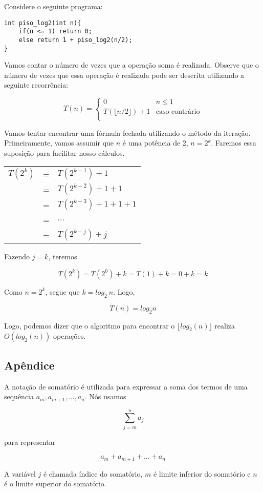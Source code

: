 Considere o seguinte programa:


\begin{verbatim}
int piso_log2(int n){
    if(n <= 1) return 0;
    else return 1 + piso_log2(n/2);
}
\end{verbatim}

Vamos contar o número de vezes que a operação soma é realizada. Observe que o número de vezes que essa operação é realizada pode ser descrita utilizando a seguinte recorrência:

$$
T(n) = 
\begin{cases}
0 & n \leq 1\\
T( \lfloor n/2 \rfloor ) + 1 & \text{caso contrário}\\
\end{cases}
$$

Vamos tentar encontrar uma fórmula fechada utilizando o método da iteração. Primeiramente, vamos assumir que $n$ é uma potência de 2, $n = 2^k$. Faremos essa suposição para facilitar nosso cálculos.

\begin{tabular}{lll}
$T(2^k)$ & = & $T(2^{k-1}) + 1$ \\
       & = & $T(2^{k-2}) + 1 + 1$\\
       & = & $T(2^{k-3}) + 1 + 1 + 1$\\
       & = & $\ldots$ \\
       & = &  $T(2^{k-j}) + j$\\
\end{tabular}

Fazendo $j = k$, teremos

$$T(2^k) = T(2^0) + k = T(1) + k = 0 + k = k$$

Como $n = 2^k$, segue que $k = log_2 ~n$. Logo,

$$T(n) = log_2 n$$

Logo, podemos dizer que o algoritmo para encontrar o $\lfloor log_2(n) \rfloor$ realiza $O(log_2(n) )$ operações.

\subsection{Apêndice}

\begin{definition}
A notação de somatório é utilizada para expressar a soma dos termos de uma sequência $a_m, a_{m+1}, \ldots, a_n$. Nós usamos

$$
\sum_{j = m}^{n} a_j
$$

para representar

$$
a_{m} + a_{m+1} + \ldots + a_{n}
$$

A variável $j$ é chamada índice do somatório, $m$ é limite inferior do somatório e $n$ é o limite superior do somatório.

\end{definition}

